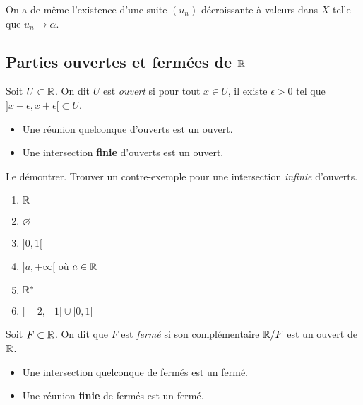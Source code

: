 \documentclass[../main.tex]{subfiles}
\begin{document}
On a de même l'existence d'une suite $(u_n)$ décroissante à valeurs dans $X$ telle que $u_n\longrightarrow \alpha$.

\subsection{Parties ouvertes et fermées de $\mathbb R$}

\begin{mydef}[Ouvert]
	Soit $U\subset\mathbb R$. On dit $U$ est \textit{ouvert} si pour tout $x\in U$, il existe $\epsilon > 0$ tel que ${]x-\epsilon,x+\epsilon[}\subset U$.
\end{mydef}

\begin{prop}\leavevmode
	\begin{itemize}
		\item Une réunion quelconque d'ouverts est un ouvert.
		\item Une intersection \textbf{finie} d'ouverts est un ouvert.
	\end{itemize}
\end{prop}

\begin{exo}[M]
	Le démontrer. Trouver un contre-exemple pour une intersection \textit{infinie} d'ouverts.
\end{exo}

\begin{exe}
	\begin{multicols}{2}
		\begin{enumerate}
			\item $\mathbb R$
			\item $\varnothing$
			\item $]0,1[$
			\item $]a,+\infty[$ où $a\in\mathbb R$
			\item $\mathbb R^*$
			\item ${]-2,-1[}\cup{]0,1[}$
		\end{enumerate}
	\end{multicols}
\end{exe}

\begin{mydef}[Fermé]
	Soit $F\subset\mathbb R$. On dit que $F$ est \textit{fermé} si son complémentaire $\mathbb R/F$ est un ouvert de $\mathbb R$.
\end{mydef}

\begin{prop}\leavevmode
	\begin{itemize}
		\item Une intersection quelconque de fermés est un fermé.
		\item Une réunion \textbf{finie} de fermés est un fermé.
	\end{itemize}
\end{prop}
\end{document}
